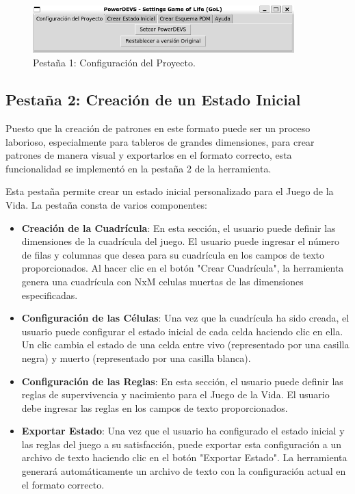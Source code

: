 \documentclass[]{article}
\begin{document}
\begin{figure}[H]
  \centering
  \includegraphics[width=0.9\textwidth]{../assets/gui/pestania1.png}
  \caption{Pestaña 1: Configuración del Proyecto.}
  \label{fig:tab1}
\end{figure}

\subsection{Pestaña 2: Creación de un Estado Inicial}

Puesto que la creación de patrones en este formato puede ser un proceso laborioso, especialmente para tableros de grandes dimensiones, para crear patrones de manera visual y exportarlos en el formato correcto, esta funcionalidad se implementó en la pestaña 2 de la herramienta.

Esta pestaña permite crear un estado inicial personalizado para el Juego de la Vida. La pestaña consta de varios componentes:

\begin{itemize}
  \item \textbf{Creación de la Cuadrícula}: En esta sección, el usuario puede definir las dimensiones de la cuadrícula del juego. El usuario puede ingresar el número de filas y columnas que desea para su cuadrícula en los campos de texto proporcionados. Al hacer clic en el botón "Crear Cuadrícula", la herramienta genera una cuadrícula con NxM celulas muertas de las dimensiones especificadas.

  \item \textbf{Configuración de las Células}: Una vez que la cuadrícula ha sido creada, el usuario puede configurar el estado inicial de cada celda haciendo clic en ella. Un clic cambia el estado de una celda entre vivo (representado por una casilla negra) y muerto (representado por una casilla blanca).

  \item \textbf{Configuración de las Reglas}: En esta sección, el usuario puede definir las reglas de supervivencia y nacimiento para el Juego de la Vida. El usuario debe ingresar las reglas en los campos de texto proporcionados.

  \item \textbf{Exportar Estado}: Una vez que el usuario ha configurado el estado inicial y las reglas del juego a su satisfacción, puede exportar esta configuración a un archivo de texto haciendo clic en el botón "Exportar Estado". La herramienta generará automáticamente un archivo de texto con la configuración actual en el formato correcto.

\end{itemize}
\end{document}
